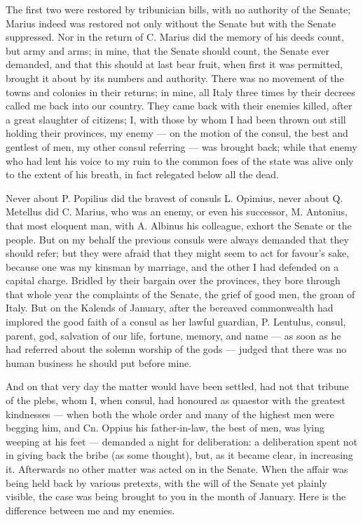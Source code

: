  The first two were restored by tribunician bills, with no authority of the Senate; Marius indeed was restored not only without the Senate but with the Senate suppressed. Nor in the return of C. Marius did the memory of his deeds count, but army and arms; in mine, that the Senate should count, the Senate ever demanded, and that this should at last bear fruit, when first it was permitted, brought it about by its numbers and authority. There was no movement of the towns and colonies in their returns; in mine, all Italy three times by their decrees called me back into our country. They came back with their enemies killed, after a great slaughter of citizens; I, with those by whom I had been thrown out still holding their provinces, my enemy --- on the motion of the consul, the best and gentlest of men, my other consul referring --- was brought back; while that enemy who had lent his voice to my ruin to the common foes of the state was alive only to the extent of his breath, in fact relegated below all the dead.

 Never about P. Popilius did the bravest of consuls L. Opimius, never about Q. Metellus did C. Marius, who was an enemy, or even his successor, M. Antonius, that most eloquent man, with A. Albinus his colleague, exhort the Senate or the people. But on my behalf the previous consuls were always demanded that they should refer; but they were afraid that they might seem to act for favour's sake, because one was my kinsman by marriage, and the other I had defended on a capital charge. Bridled by their bargain over the provinces, they bore through that whole year the complaints of the Senate, the grief of good men, the groan of Italy. But on the Kalends of January, after the bereaved commonwealth had implored the good faith of a consul as her lawful guardian, P. Lentulus, consul, parent, god, salvation of our life, fortune, memory, and name --- as soon as he had referred about the solemn worship of the gods --- judged that there was no human business he should put before mine.

 And on that very day the matter would have been settled, had not that tribune of the plebs, whom I, when consul, had honoured as quaestor with the greatest kindnesses --- when both the whole order and many of the highest men were begging him, and Cn. Oppius his father-in-law, the best of men, was lying weeping at his feet --- demanded a night for deliberation: a deliberation spent not in giving back the bribe (as some thought), but, as it became clear, in increasing it. Afterwards no other matter was acted on in the Senate. When the affair was being held back by various pretexts, with the will of the Senate yet plainly visible, the case was being brought to you in the month of January. Here is the difference between me and my enemies.


